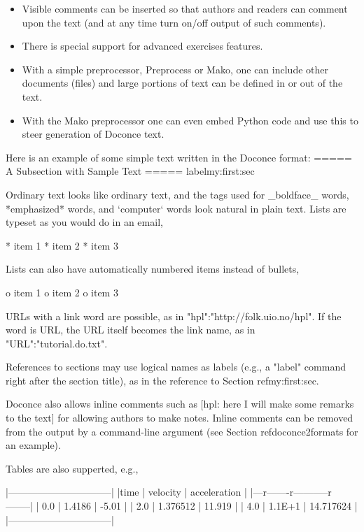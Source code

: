 \documentclass{book}
\begin{document}
\begin{itemize}
  \item Visible comments can be inserted so that authors and readers can
    comment upon the text (and at any time turn on/off output of such
    comments).

  \item There is special support for advanced exercises features.

  \item With a simple preprocessor, Preprocess or Mako, one can include
    other documents (files) and large portions of text can be defined
    in or out of the text.

  \item With the Mako preprocessor one can even embed Python
    code and use this to steer generation of Doconce text.
\end{itemize}

\noindent
Here is an example of some simple text written in the Doconce format:
\bccq
===== A Subsection with Sample Text =====
label{my:first:sec}

Ordinary text looks like ordinary text, and the tags used for
_boldface_ words, *emphasized* words, and `computer` words look
natural in plain text.  Lists are typeset as you would do in an email,

  * item 1
  * item 2
  * item 3

Lists can also have automatically numbered items instead of bullets,

  o item 1
  o item 2
  o item 3

URLs with a link word are possible, as in "hpl":"http://folk.uio.no/hpl".
If the word is URL, the URL itself becomes the link name,
as in "URL":"tutorial.do.txt".

References to sections may use logical names as labels (e.g., a
"label" command right after the section title), as in the reference to
Section ref{my:first:sec}.

Doconce also allows inline comments such as [hpl: here I will make
some remarks to the text] for allowing authors to make notes. Inline
comments can be removed from the output by a command-line argument
(see Section ref{doconce2formats} for an example).

Tables are also supperted, e.g.,

  |--------------------------------|
  |time  | velocity | acceleration |
  |---r-------r-----------r--------|
  | 0.0  | 1.4186   | -5.01        |
  | 2.0  | 1.376512 | 11.919       |
  | 4.0  | 1.1E+1   | 14.717624    |
  |--------------------------------|
\end{document}
